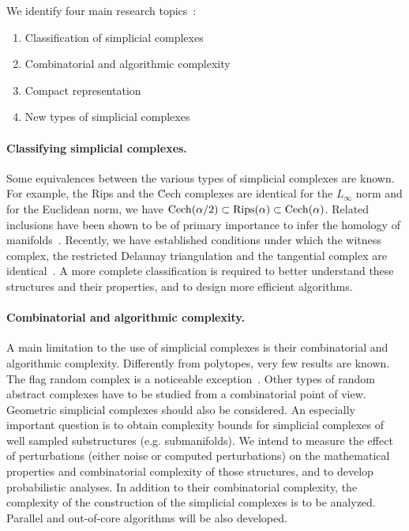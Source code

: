We identify four main research topics~:
\begin{enumerate}
\item Classification of simplicial complexes
\item Combinatorial and algorithmic complexity 
\item Compact representation
\item New types of simplicial complexes
\end{enumerate}

\paragraph{Classifying simplicial complexes.}
Some equivalences between the various types of simplicial complexes are known. For example,
the Rips and the \u{C}ech complexes are identical for the $L_{\infty}$ norm and for the Euclidean norm, we have $ {\rm {C}ech} ({\alpha}/{2}) \subset {\rm Rips} (\alpha) \subset {\rm {C}ech} (\alpha)$. Related inclusions %
have been shown to be of primary importance to infer the homology of manifolds~\cite{co-tpr-2008}.
Recently, we have established conditions under which the witness complex, the restricted Delaunay triangulation and the tangential complex are identical~\cite{boissonnat2012stab}. A more complete classification is required to better understand these structures and their properties, and to design
more efficient algorithms.




\paragraph{Combinatorial and algorithmic complexity.}
A main limitation to the use of simplicial complexes is their combinatorial and algorithmic complexity.  Differently from polytopes, very few results are known. The flag random complex is a noticeable exception~\cite{CambridgeJournals:2077252}. Other types of random abstract complexes have to be studied from a combinatorial point of view. Geometric simplicial complexes should also be considered.  An especially important question is to obtain complexity bounds for simplicial complexes of well sampled substructures (e.g. submanifolds).  We intend to measure the effect of perturbations (either noise or computed perturbations) on the mathematical properties and combinatorial complexity of those structures, and to develop probabilistic analyses. In addition to their combinatorial complexity, the complexity of the construction of the simplicial complexes is to be analyzed.  Parallel and out-of-core algorithms will be also developed.


